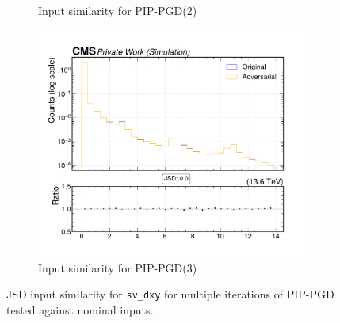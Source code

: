 \begin{figure}[htbp]
\begin{subfigure}[t]{0.32\textwidth}
    \caption*{Input similarity for PIP-PGD(2)}
  \end{subfigure}\hfill
  \begin{subfigure}[t]{0.32\textwidth}
    \includegraphics[width=\linewidth]{media/output/features/compare/combined_it_3/cmp_vtx_arr_sv_dxy.pdf}
    \caption*{Input similarity for PIP-PGD(3)}
  \end{subfigure}

  \caption*{JSD input similarity for \texttt{sv\_dxy} for multiple iterations of PIP-PGD tested against nominal inputs.}
  \label{fig:combined_input_sv_dxy}
\end{figure}

